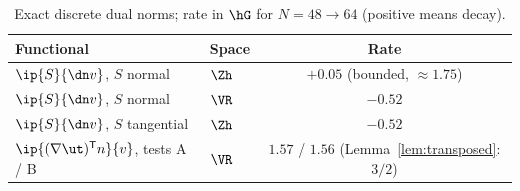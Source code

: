 \begin{table}[t]
\centering
\caption{Exact discrete dual norms; rate in $\hG$ for $N=48\to64$ (positive means decay).}\label{tab:lemma}
\begin{tabular}{llc}
\toprule
Functional & Space & Rate\\
\midrule
$\ip{S}{\dn v}$, $S$ normal & $\Zh$ & $+0.05$ (bounded, $\approx1.75$)\\
$\ip{S}{\dn v}$, $S$ normal & $\VR$ & $-0.52$\\
$\ip{S}{\dn v}$, $S$ tangential & $\Zh$ & $-0.52$\\
$\ip{(\nabla\ut)^{\mathsf T}n}{v}$, tests A / B & $\VR$ & $1.57$ / $1.56$ (Lemma~\ref{lem:transposed}: $3/2$)\\
\bottomrule
\end{tabular}
\end{table}
